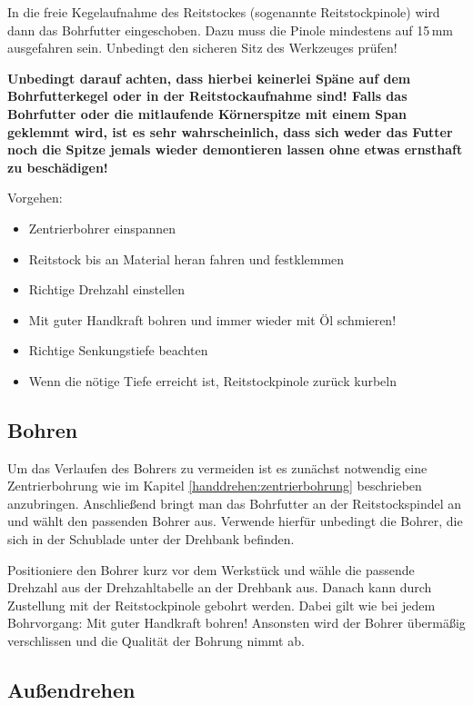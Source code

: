 \documentclass{\basedir/fablab-document}
\begin{document}
In die freie Kegelaufnahme des Reitstockes (sogenannte Reitstockpinole) wird dann das Bohrfutter eingeschoben.
Dazu muss die Pinole mindestens auf 15\,mm ausgefahren sein.
Unbedingt den sicheren Sitz des Werkzeuges prüfen!

\textbf{Unbedingt darauf achten, dass hierbei keinerlei Späne auf dem Bohrfutterkegel oder in der Reitstockaufnahme sind! Falls das Bohrfutter oder die mitlaufende Körnerspitze mit einem Span geklemmt wird, ist es sehr wahrscheinlich, dass sich weder das Futter noch die Spitze jemals wieder demontieren lassen ohne etwas ernsthaft zu beschädigen!}

Vorgehen:
\begin{itemize}
\item Zentrierbohrer einspannen
\item Reitstock bis an Material heran fahren und festklemmen
\item Richtige Drehzahl einstellen
\item Mit guter Handkraft bohren und immer wieder mit Öl schmieren!
\item Richtige Senkungstiefe beachten
\item Wenn die nötige Tiefe erreicht ist, Reitstockpinole zurück kurbeln

\end{itemize}

\subsection{Bohren}

Um das Verlaufen des Bohrers zu vermeiden ist es zunächst notwendig eine Zentrierbohrung wie im Kapitel \ref{handdrehen:zentrierbohrung} beschrieben anzubringen.
Anschließend bringt man das Bohrfutter an der Reitstockspindel an und wählt den passenden Bohrer aus.
Verwende hierfür unbedingt die Bohrer, die sich in der Schublade unter der Drehbank befinden.

Positioniere den Bohrer kurz vor dem Werkstück und wähle die passende Drehzahl aus der Drehzahltabelle an der Drehbank aus.
Danach kann durch Zustellung mit der Reitstockpinole gebohrt werden.
Dabei gilt wie bei jedem Bohrvorgang: Mit guter Handkraft bohren!
Ansonsten wird der Bohrer übermäßig verschlissen und die Qualität der Bohrung nimmt ab.

\subsection{Außendrehen} 
\end{document}
